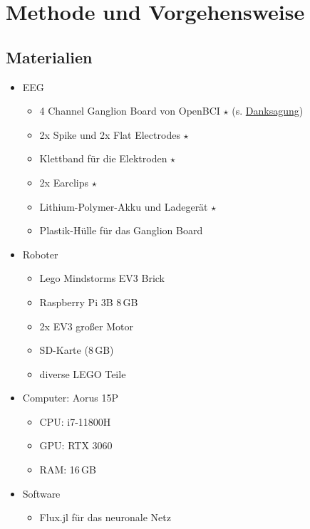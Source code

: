 \documentclass[10pt]{scrartcl}
\begin{document}
	\section{Methode und Vorgehensweise}

	\subsection{Materialien} \label{Materialien}

	\begin{itemize}
		\item EEG
		\begin{itemize}
			\item 4 Channel Ganglion Board von OpenBCI $\star$ (s. \hyperref[Foerderverein]{Danksagung})
			\item 2x Spike und 2x Flat Electrodes  $\star$
			\item Klettband für die Elektroden $\star$
			\item 2x Earclips $\star$
			\item Lithium-Polymer-Akku und Ladegerät $\star$
			\item Plastik-Hülle für das Ganglion Board
		\end{itemize}

		\item Roboter
		\begin{itemize}
			\item Lego Mindstorms EV3 Brick
			\item Raspberry Pi 3B 8\,GB
			\item 2x EV3 großer Motor
			\item SD-Karte (8\,GB)
			\item diverse LEGO Teile
		\end{itemize}

		\item Computer: Aorus 15P
		\begin{itemize}
			\item CPU: i7-11800H
			\item GPU: RTX 3060
			\item RAM: 16\,GB
		\end{itemize}

		\item Software
		\begin{itemize}
			\item Flux.jl für das neuronale Netz
				\cite{Flux.jl-2018}
				\cite{innes:2018}
			

\end{itemize}
\end{itemize}
\end{document}
